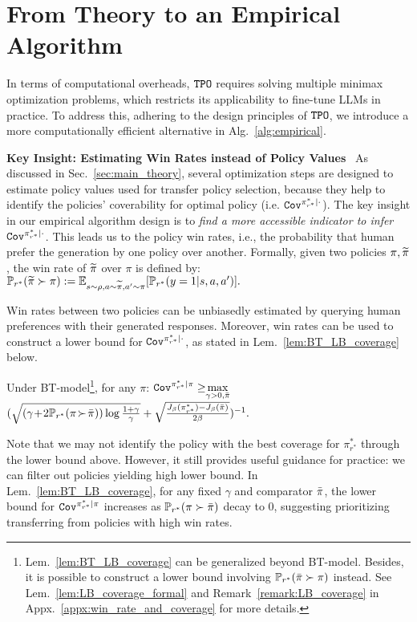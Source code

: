 
\section{From Theory to an Empirical Algorithm}\label{sec:empirical_alg}
In terms of computational overheads, ${\texttt{TPO}}$ requires solving multiple minimax optimization problems, which restricts its applicability to fine-tune LLMs in practice.
To address this, adhering to the design principles of ${\texttt{TPO}}$, we introduce a more computationally efficient alternative in Alg.~\ref{alg:empirical}.

\textbf{Key Insight: Estimating Win Rates instead of Policy Values}~
As discussed in Sec.~\ref{sec:main_theory}, several optimization steps are designed to estimate policy values used for transfer policy selection, because they help to identify the policies' coverability for optimal policy (i.e. ${\texttt{Cov}}^{\pi^*_{r^*}|\cdot}$).
The key insight in our empirical algorithm design is to \emph{find a more accessible indicator to infer ${\texttt{Cov}}^{\pi^*_{r^*}|\cdot}$}.
This leads us to the policy win rates, i.e., the probability that human prefer the generation by one policy over another. Formally, given two policies $\pi, \widetilde{\pi}$, the win rate of $\widetilde{\pi}$ over $\pi$ is defined by:
$
    {\mathbb{P}}_{r^*}(\widetilde{\pi} \succ \pi) := \mathbb{E}_{s\sim\rho,a\sim\widetilde{\pi},a'\sim\pi}[{\mathbb{P}}_{r^*}(y=1|s,a,a')].
$

Win rates between two policies can be unbiasedly estimated by querying human preferences with their generated responses.
Moreover, win rates can be used to construct a lower bound for ${\texttt{Cov}}^{\pi^*_{r^*}|\cdot}$, as stated in Lem.~\ref{lem:BT_LB_coverage} below.
\begin{lemma}\label{lem:BT_LB_coverage}
    Under BT-model\footnote{
        Lem.~\ref{lem:BT_LB_coverage} can be generalized beyond BT-model.
        Besides, it is possible to construct a lower bound involving ${\mathbb{P}}_{r^*}(\bar{\pi}\succ\pi)$ instead.
        See Lem.~\ref{lem:LB_coverage_formal} and Remark~\ref{remark:LB_coverage} in Appx.~\ref{appx:win_rate_and_coverage} for more details.
        }, for any $\pi$:
    $\displaystyle{\texttt{Cov}}^{\pi^*_{r^*}|\pi}\geq \!$$
    \displaystyle\max_{\gamma > 0, \bar{\pi}} $$({\sqrt{(\gamma\! +\! 2{\mathbb{P}}_{r^*}(\pi\!\succ \!\bar{\pi}))  \log \frac{1+\gamma}{\gamma}} + \sqrt{\frac{J_\beta(\pi^*_{r^*}) - J_\beta(\bar{\pi})}{2\beta}}})^{-1}.$
\end{lemma}
Note that we may not identify the policy with the best coverage for $\pi^*_{r^*}$ through the lower bound above.
However, it still provides useful guidance for practice: we can filter out policies yielding high lower bound.
In Lem.~\ref{lem:BT_LB_coverage}, for any fixed $\gamma$ and comparator $\bar{\pi}$, the lower bound for ${\texttt{Cov}}^{\pi^*_{r^*}|\pi}$ increases as ${\mathbb{P}}_{r^*}(\pi \succ \bar{\pi})$ decay to 0, suggesting prioritizing transferring from policies with high win rates.

